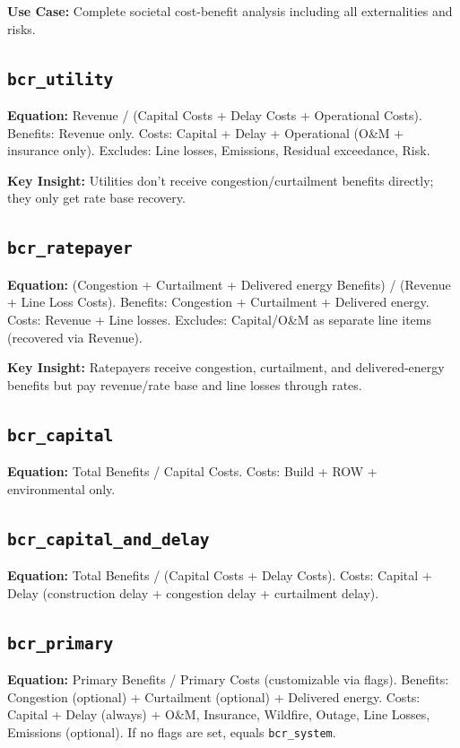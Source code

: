 \documentclass[ctcc_full_documentation.tex]{subfiles}
\begin{document}
\textbf{Use Case:} Complete societal cost-benefit analysis including all externalities and risks.

\subsection{\texttt{bcr\_utility}}

\textbf{Equation:} Revenue / (Capital Costs + Delay Costs + Operational Costs). Benefits: Revenue only. Costs: Capital + Delay + Operational (O\&M + insurance only). Excludes: Line losses, Emissions, Residual exceedance, Risk.

\textbf{Key Insight:} Utilities don't receive congestion/curtailment benefits directly; they only get rate base recovery.

\subsection{\texttt{bcr\_ratepayer}}

\textbf{Equation:} (Congestion + Curtailment + Delivered energy Benefits) / (Revenue + Line Loss Costs). Benefits: Congestion + Curtailment + Delivered energy. Costs: Revenue + Line losses. Excludes: Capital/O\&M as separate line items (recovered via Revenue).

\textbf{Key Insight:} Ratepayers receive congestion, curtailment, and delivered-energy benefits but pay revenue/rate base and line losses through rates.

\subsection{\texttt{bcr\_capital}}

\textbf{Equation:} Total Benefits / Capital Costs. Costs: Build + ROW + environmental only.

\subsection{\texttt{bcr\_capital\_and\_delay}}

\textbf{Equation:} Total Benefits / (Capital Costs + Delay Costs). Costs: Capital + Delay (construction delay + congestion delay + curtailment delay).

\subsection{\texttt{bcr\_primary}}

\textbf{Equation:} Primary Benefits / Primary Costs (customizable via flags). Benefits: Congestion (optional) + Curtailment (optional) + Delivered energy. Costs: Capital + Delay (always) + O\&M, Insurance, Wildfire, Outage, Line Losses, Emissions (optional). If no flags are set, equals \texttt{bcr\_system}.
\end{document}
